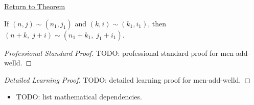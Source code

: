 \newpage
{}
\label{prf:men-add-welld}

\begin{remark*}[Return]
\hyperref[lem:men-add-welld]{Return to Theorem}
\end{remark*}

\begin{theorem*}
If $(n,j) \sim (n_1,j_1)$ and $(k,i) \sim (k_1,i_1)$, then
$(n+k,\; j+i) \sim (n_1+k_1,\; j_1+i_1)$.
\end{theorem*}

\begin{proof}[Professional Standard Proof]
\LRAProofBodyStart
TODO: professional standard proof for men-add-welld.
\end{proof}

\begin{proof}[Detailed Learning Proof]
\LRAProofBodyStart
TODO: detailed learning proof for men-add-welld.
\end{proof}

\begin{remark*}
\end{remark*}

\begin{dependencies}
\begin{itemize}
  \item TODO: list mathematical dependencies.
\end{itemize}
\end{dependencies}

\clearpage
